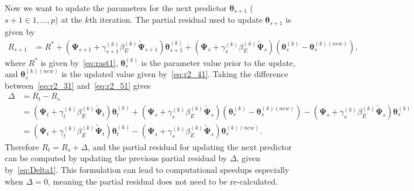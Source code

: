 \documentclass[a4paper,fleqn]{cas-sc}
\newcommand{\btheta}{\boldsymbol{\theta}}
\newcommand{\bPsi}{\boldsymbol{\Psi}}
\begin{document}
Now we want to update the parameters for the next predictor $\btheta_{s+1}$ ($s+1 \in {1,\ldots, p}$) at the $k$th iteration. The partial residual used to update $\btheta_{s+1}$ is given by
\begin{align}
R_{s+1} & = R^\ast + (\bPsi_{s+1} + \gamma_{s+1}^{(k)}\beta_E^{(k)} \widetilde{\bPsi}_{s+1})\btheta_{s+1}^{(k)} + (\bPsi_s + \gamma_s^{(k)}\beta_E^{(k)} \widetilde{\bPsi}_s)(\btheta_s^{(k)} - \btheta_s^{(k)(new)}), \label{eq:r2_51}
\end{align}
where $R^\ast$ is given by~\eqref{eq:rast1}, $\btheta_s^{(k)}$ is the parameter value prior to the update, and $\btheta_s^{(k)(new)}$ is the updated value given by~\eqref{eq:r2_41}. Taking the difference between~\eqref{eq:r2_31} and~\eqref{eq:r2_51} gives
\begin{align}
\Delta & = R_t - R_s \nonumber\\
& = (\bPsi_t + \gamma_t^{(k)}\beta_E^{(k)} \widetilde{\bPsi}_t)\btheta_t^{(k)} + (\bPsi_s + \gamma_s^{(k)}\beta_E^{(k)} \widetilde{\bPsi}_s)(\btheta_s^{(k)} - \btheta_s^{(k)(new)}) - (\bPsi_s + \gamma_s^{(k)}\beta_E^{(k)} \widetilde{\bPsi}_s)\btheta_s^{(k)} \nonumber\\
& = (\bPsi_t + \gamma_t^{(k)}\beta_E^{(k)} \widetilde{\bPsi}_t)\btheta_t^{(k)} - (\bPsi_s + \gamma_s^{(k)}\beta_E^{(k)} \widetilde{\bPsi}_s)\btheta_s^{(k)(new)}. \label{eq:Delta1}
\end{align}
Therefore $R_t = R_s + \Delta$, and the partial residual for updating the next predictor can be computed by updating the previous partial residual by $\Delta$, given by~\eqref{eq:Delta1}. This formulation can lead to computational speedups especially when $\Delta = 0$, meaning the partial residual does not need to be re-calculated.
\end{document}
